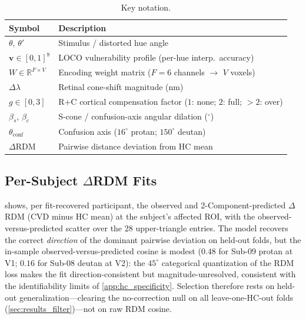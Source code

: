 \documentclass{article}
\begin{document}
\begin{table}[h]
  \caption{Key notation.}
  \label{tab:notation}
  \begin{center}
  \begin{small}
  \begin{tabular}{@{}ll@{}}
    \toprule
    Symbol & Description \\
    \midrule
    $\theta$, $\theta'$ & Stimulus / distorted hue angle \\
    $\mathbf{v} \in [0,1]^8$ & LOCO vulnerability profile (per-hue interp.\ accuracy) \\
    $W \in \mathbb{R}^{F\times V}$ & Encoding weight matrix ($F{=}6$ channels $\to$ $V$ voxels) \\
    $\Delta\lambda$ & Retinal cone-shift magnitude (nm) \\
    $g \in [0,3]$ & R+C cortical compensation factor ($1$: none; $2$: full; $>2$: over) \\
    $\beta_s$, $\beta_c$ & S-cone / confusion-axis angular dilation ($^\circ$) \\
    $\theta_{\text{conf}}$ & Confusion axis ($16^\circ$ protan; $150^\circ$ deutan) \\
    $\Delta$RDM & Pairwise distance deviation from HC mean \\
    \bottomrule
  \end{tabular}
  \end{small}
  \end{center}
\end{table}

\subsection{Per-Subject $\Delta$RDM Fits}
\label{app:rdmfit}

 shows, per fit-recovered participant, the observed and 2-Component-predicted $\Delta$RDM (CVD minus HC mean) at the subject's affected ROI, with the observed-versus-predicted scatter over the 28 upper-triangle entries.
The model recovers the correct \emph{direction} of the dominant pairwise deviation on held-out folds, but the in-sample observed-versus-predicted cosine is modest ($0.48$ for Sub-09 protan at V1; $0.16$ for Sub-08 deutan at V2): the $45^\circ$ categorical quantization of the RDM loss makes the fit direction-consistent but magnitude-unresolved, consistent with the identifiability limits of \cref{app:hc_specificity}.
Selection therefore rests on held-out generalization---clearing the no-correction null on all leave-one-HC-out folds (\cref{sec:results_filter})---not on raw RDM cosine.
\end{document}
